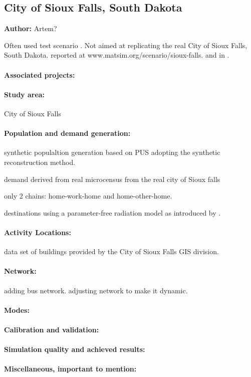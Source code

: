 \subsection{City of Sioux Falls, South Dakota}
\label{ch:scenarios:siouxfalls}
\hfill \textbf{Author:} Artem?

Often used test scenario \citep[][]{BarGera_TNTP_Webpage_2013}. Not aimed at replicating the real City of Sioux Falls, South Dakota.
reported at www.matsim.org/scenario/sioux-falls.
and in \citet[][]{ChakirovFourie_TechRep_FCL_2014}.


\paragraph{Associated projects:} 

\paragraph{Study area:} City of Sioux Falls

\paragraph{Population and demand generation:}
synthetic populaltion generation based on PUS adopting the synthetic reconstruction method.

demand
derived from real microcensus from the real city of Sioux falls

only 2 chains: home-work-home and home-other-home.

destinations using a parameter-free radiation model as introduced by \citet[][]{SiminiEtAl_NAT_2012}.

\paragraph{Activity Locations:} data set of buildings provided by the City of Sioux Falls GIS division.

\paragraph{Network:} adding bus network. adjusting network to make it dynamic.

\paragraph{Modes:}

\paragraph{Calibration and validation:}

\paragraph{Simulation quality and achieved results:}

\paragraph{Miscellaneous, important to mention:}

